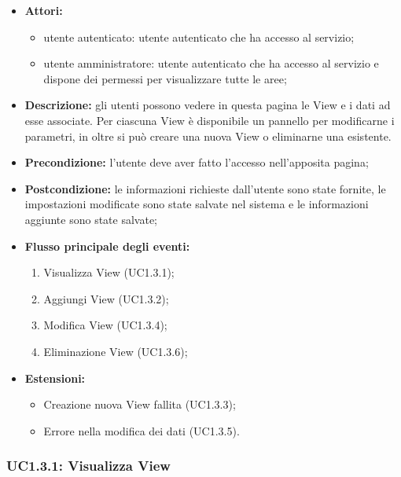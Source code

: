 \begin{itemize}
    \item \textbf{Attori:}
    \begin{itemize}
    	\item utente autenticato: utente autenticato che ha accesso al servizio;
    	\item utente amministratore: utente autenticato che ha accesso al servizio e dispone dei permessi per visualizzare tutte le aree;
	\end{itemize}
	 \item \textbf{Descrizione:} gli utenti possono vedere in questa pagina le View\gloss{} e i dati ad esse associate. Per ciascuna View è disponibile un pannello per modificarne i parametri, in oltre si può creare una nuova View o eliminarne una esistente.
    \item \textbf{Precondizione:} l'utente deve aver fatto l'accesso nell'apposita pagina;
    \item \textbf{Postcondizione:} le informazioni richieste dall'utente sono state fornite, le impostazioni modificate sono state salvate nel sistema e le informazioni aggiunte sono state salvate;
    \item \textbf{Flusso principale degli eventi:}
    	\begin{enumerate}
    		\item Visualizza View\gloss{} (UC1.3.1);
    		\item Aggiungi View\gloss{} (UC1.3.2);
    		\item Modifica View\gloss{} (UC1.3.4);
    		\item Eliminazione View\gloss{} (UC1.3.6);
    	\end{enumerate}
    \item \textbf{Estensioni:}
    \begin{itemize}
    	\item Creazione nuova View\gloss{} fallita (UC1.3.3);
    	\item Errore nella modifica dei dati (UC1.3.5).
	\end{itemize}
\end{itemize}

\subsubsection{UC1.3.1: Visualizza View}

